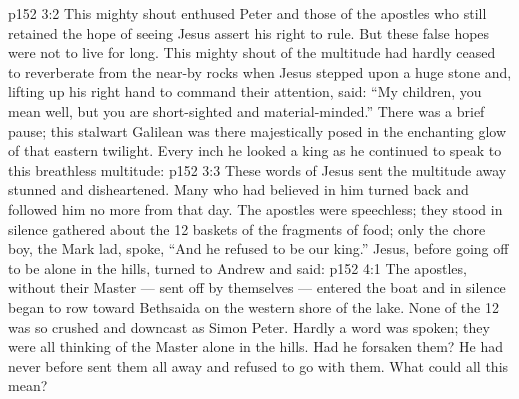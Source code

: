 \vs p152 3:2 This mighty shout enthused Peter and those of the apostles who still retained the hope of seeing Jesus assert his right to rule. But these false hopes were not to live for long. This mighty shout of the multitude had hardly ceased to reverberate from the near\hyp{}by rocks when Jesus stepped upon a huge stone and, lifting up his right hand to command their attention, said: “My children, you mean well, but you are short\hyp{}sighted and material\hyp{}minded.” There was a brief pause; this stalwart Galilean was there majestically posed in the enchanting glow of that eastern twilight. Every inch he looked a king as he continued to speak to this breathless multitude: 
\vs p152 3:3 \pc These words of Jesus sent the multitude away stunned and disheartened. Many who had believed in him turned back and followed him no more from that day. The apostles were speechless; they stood in silence gathered about the 12 baskets of the fragments of food; only the chore boy, the Mark lad, spoke, “And he refused to be our king.” Jesus, before going off to be alone in the hills, turned to Andrew and said: 
\vs p152 4:1 The apostles, without their Master --- sent off by themselves --- entered the boat and in silence began to row toward Bethsaida on the western shore of the lake. None of the 12 was so crushed and downcast as Simon Peter. Hardly a word was spoken; they were all thinking of the Master alone in the hills. Had he forsaken them? He had never before sent them all away and refused to go with them. What could all this mean?
